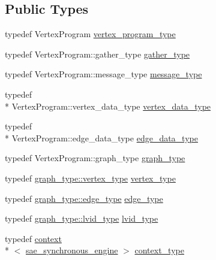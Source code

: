 \subsection*{Public Types}
\begin{DoxyCompactItemize}
\item 
typedef Vertex\-Program \hyperlink{classsaedb_1_1sae__synchronous__engine_a9acef979358002e4497dfc877b9fca81}{vertex\-\_\-program\-\_\-type}
\item 
typedef Vertex\-Program\-::gather\-\_\-type \hyperlink{classsaedb_1_1sae__synchronous__engine_a93815ca5d2b8fb54e1dbeda9595e852f}{gather\-\_\-type}
\item 
typedef Vertex\-Program\-::message\-\_\-type \hyperlink{classsaedb_1_1sae__synchronous__engine_ac357ebb2c5a1d064c39189cf66ea3115}{message\-\_\-type}
\item 
typedef \\*
Vertex\-Program\-::vertex\-\_\-data\-\_\-type \hyperlink{classsaedb_1_1sae__synchronous__engine_a2656a04cb1413ab13189a4ea47accdb6}{vertex\-\_\-data\-\_\-type}
\item 
typedef \\*
Vertex\-Program\-::edge\-\_\-data\-\_\-type \hyperlink{classsaedb_1_1sae__synchronous__engine_a1dc041ad51a5c58fc1a2b58b962069f7}{edge\-\_\-data\-\_\-type}
\item 
typedef Vertex\-Program\-::graph\-\_\-type \hyperlink{classsaedb_1_1sae__synchronous__engine_a1eb5ce9b2d9118a21a615211fb026a0e}{graph\-\_\-type}
\item 
typedef \hyperlink{structsaedb_1_1sae__graph_1_1vertex__type}{graph\-\_\-type\-::vertex\-\_\-type} \hyperlink{classsaedb_1_1sae__synchronous__engine_af1ef5f965b2a0f31a1dec2d6125a0b1d}{vertex\-\_\-type}
\item 
typedef \hyperlink{classsaedb_1_1sae__graph_1_1edge__type}{graph\-\_\-type\-::edge\-\_\-type} \hyperlink{classsaedb_1_1sae__synchronous__engine_afc24e00d4e98d9bc1b8b6634d94f13e8}{edge\-\_\-type}
\item 
typedef \hyperlink{classsaedb_1_1sae__graph_afcd2ad6444e374e40a7a5ee4c46be052}{graph\-\_\-type\-::lvid\-\_\-type} \hyperlink{classsaedb_1_1sae__synchronous__engine_a620457f95f0672c538683e94bf97fa2b}{lvid\-\_\-type}
\item 
typedef \hyperlink{classsaedb_1_1context}{context}\\*
$<$ \hyperlink{classsaedb_1_1sae__synchronous__engine}{sae\-\_\-synchronous\-\_\-engine} $>$ \hyperlink{classsaedb_1_1sae__synchronous__engine_a82839f59e66261a2b6f9ae981036e674}{context\-\_\-type}
\end{DoxyCompactItemize}
